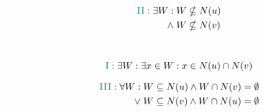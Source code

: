 \begin{frame}
  \begin{description}
    \item[$\teal{\textsc{II}}$]
      \begin{align*}
	\textcolor{teal}{\textsc{II}:}\; 
	\exists W:\; &W \nsubseteq N(u) \\
	      \land\; &W \nsubseteq N(v)
      \end{align*}

    \item[$\red{\textsc{II}'}$] \textcolor{white}{dummy}
      \[
	\textcolor{teal}{\textsc{I}:}\; 
	\exists W: \exists x \in W: x \in N(u) \cap N(v)
      \]

      \begin{align*}
	\textcolor{teal}{\textsc{III}:}\; 
	\forall W: \;&W \subseteq N(u) \land W \cap N(v) = \emptyset \\
	      \lor\; &W \subseteq N(v) \land W \cap N(u) = \emptyset
      \end{align*}

  \end{description}
\end{frame}

